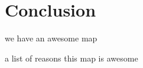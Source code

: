 \section{Conclusion}
\label{sec:conclusion}
we have an awesome map

a list of reasons this map is awesome
